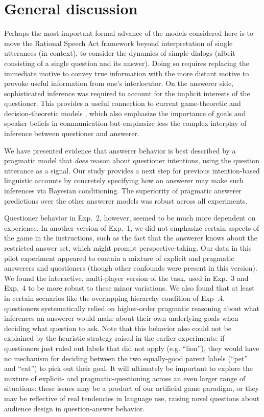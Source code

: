 \documentclass[12pt, floatsintext, jou]{apa6}
\begin{document}
\section{General discussion}
\label{sec:gd}

Perhaps the most important formal advance of the models considered here is to move the Rational Speech Act framework beyond interpretation of single utterances (in context), to consider the dynamics of simple dialogs (albeit consisting of a single question and its answer). 
Doing so requires replacing the immediate motive to convey true information with the more distant motive to provoke useful information from one's interlocutor. On the answerer side, sophisticated inference was required to account for the implicit interests of the questioner. This provides a useful connection to current game-theoretic and decision-theoretic models \cite{VogelBodoiaPottsJurafsky13_GricePOMDP, VanRooy03_QuestioningDecisionProblems}, which also emphasize the importance of goals and speaker beliefs in communication but emphasize less the complex interplay of inference between questioner and answerer.

We have presented evidence that answerer behavior is best described by a pragmatic model that \emph{does} reason about questioner intentions, using the question utterance as a signal. Our study provides a next step for previous intention-based linguistic accounts by concretely specifying how an answerer may make such inferences via Bayesian conditioning. The superiority of pragmatic answerer predictions over the other answerer models was robust across all experiments. 

Questioner behavior in Exp.~2, however, seemed to be much more dependent on experience. In another version of Exp.~1, we did not emphasize certain aspects of the game in the instructions, such as the fact that the answerer knows about the restricted answer set, which might prompt perspective-taking. 
Our data in this pilot experiment appeared to contain a mixture of explicit and pragmatic answerers and questioners (though other confounds were present in this version). We found the interactive, multi-player version of the task, used in Exp.~3 and Exp.~4 to be more robust to these minor variations. We also found that at least in certain scenarios like the overlapping hierarchy condition of Exp~.4, questioners systematically relied on higher-order pragmatic reasoning about what inferences an answerer would make about their own underlying goals when deciding what question to ask. Note that this behavior also could not be explained by the heuristic strategy raised in the earlier experiments: if questioners just ruled out labels that did not apply (e.g. ``lion''), they would have no mechanism for deciding between the two equally-good parent labels (``pet'' and ``cat'') to pick out their goal. It will ultimately be important to explore the mixture of explicit- and pragmatic-questioning across an even larger range of situations: these issues may be a product of our artificial game paradigm, or they may be reflective of real tendencies in language use, raising novel questions about audience design in question-answer behavior.
\end{document}
